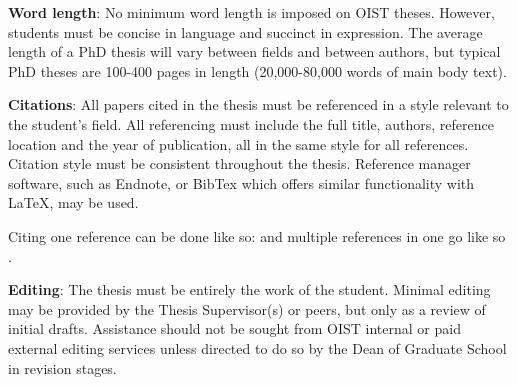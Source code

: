 \textbf{Word length}: No minimum word length is imposed on OIST theses.  However, students must be concise in language and succinct in expression.  The average length of a PhD thesis will vary between fields and between authors, but typical PhD theses are 100-400 pages in length (20,000-80,000 words of main body text).

\textbf{Citations}: All papers cited in the thesis must be referenced in a style relevant to the student’s field.  All referencing must include the full title, authors, reference location and the year of publication, all in the same style for all references.  Citation style must be consistent throughout the thesis.  Reference manager software, such as Endnote, or BibTex which offers similar functionality with \LaTeX, may be used. 

Citing one reference can be done like so: \cite{Lee98} and multiple references in one go like so \cite{Fil09, Muc10, Kra27}.

\textbf{Editing}: The thesis must be entirely the work of the student.  Minimal editing may be provided by the Thesis Supervisor(s) or peers, but only as a review of initial drafts.  Assistance should not be sought from OIST internal or paid external editing services unless directed to do so by the Dean of Graduate School in revision stages.

